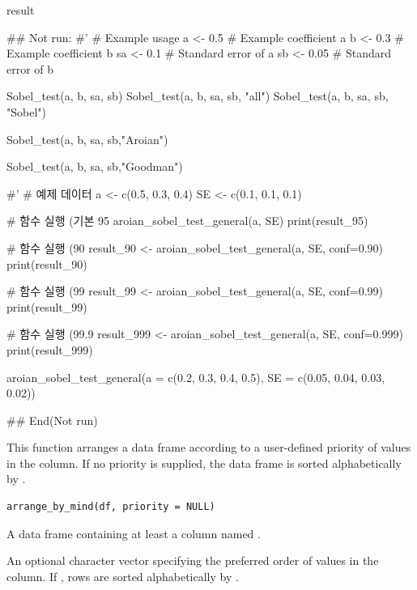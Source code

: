 \documentclass[a4paper]{book}
\begin{document}
%
\begin{Value}
result
\end{Value}
%
\begin{Examples}
\begin{ExampleCode}

## Not run: 
#'
# Example usage
a <- 0.5  # Example coefficient a
b <- 0.3  # Example coefficient b
sa <- 0.1 # Standard error of a
sb <- 0.05 # Standard error of b

Sobel_test(a, b, sa, sb)
Sobel_test(a, b, sa, sb, "all")
Sobel_test(a, b, sa, sb, "Sobel")

Sobel_test(a, b, sa, sb,"Aroian")

Sobel_test(a, b, sa, sb,"Goodman")

#'
# 예제 데이터
a <- c(0.5, 0.3, 0.4)
SE <- c(0.1, 0.1, 0.1)

# 함수 실행 (기본 95%
aroian_sobel_test_general(a, SE)
print(result_95)

# 함수 실행 (90%
result_90 <- aroian_sobel_test_general(a, SE, conf=0.90)
print(result_90)

# 함수 실행 (99%
result_99 <- aroian_sobel_test_general(a, SE, conf=0.99)
print(result_99)

# 함수 실행 (99.9%
result_999 <- aroian_sobel_test_general(a, SE, conf=0.999)
print(result_999)


aroian_sobel_test_general(a = c(0.2, 0.3, 0.4, 0.5),
                          SE = c(0.05, 0.04, 0.03, 0.02))%


## End(Not run)
\end{ExampleCode}
\end{Examples}
%
\begin{Description}
This function arranges a data frame according to a user-defined
priority of values in the  column. If no priority is supplied,
the data frame is sorted alphabetically by .
\end{Description}
%
\begin{Usage}
\begin{verbatim}
arrange_by_mind(df, priority = NULL)
\end{verbatim}
\end{Usage}
%
\begin{Arguments}
\begin{ldescription}
\item[\code{df}] A data frame containing at least a column named .

\item[\code{priority}] An optional character vector specifying the preferred
order of values in the  column. If , rows are
sorted alphabetically by .
\end{ldescription}
\end{Arguments}
\end{document}
